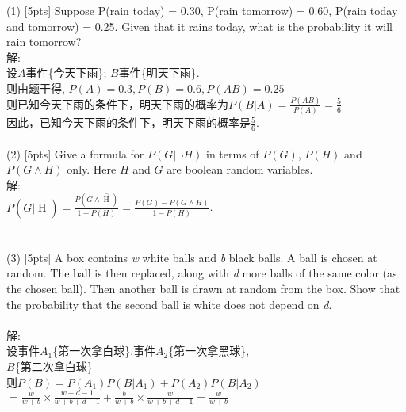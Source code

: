 \documentclass{article}
\begin{document}
	\noindent(1) [5pts] Suppose P(rain today) = 0.30, P(rain tomorrow) = 0.60,
	P(rain today and tomorrow) = 0.25. Given that it rains today, what
	is the probability it will rain tomorrow?\\
解:\\
\indent 设$A$事件\{今天下雨\}; $B$事件\{明天下雨\}.\\
\indent 则由题干得, $P(A)=0.3,P(B)=0.6,P(AB)=0.25$\\
\indent 则已知今天下雨的条件下，明天下雨的概率为$P(B|A)=\frac{P(AB)}{P(A)}=\frac{5}{6}$\\
\indent 因此，已知今天下雨的条件下，明天下雨的概率是$\frac{5}{6}$.\\
\\
	(2) [5pts] Give a formula for $P(G | \neg H)$ in terms of $P(G)$,
	$P(H)$ and $P(G \wedge H)$ only.  Here $H$ and $G$ are boolean random variables.\\
解:\\
\indent$P(G|\mathop{H}\limits^{\neg})=\frac{P(G\wedge \mathop{H}\limits^{\neg})}{1-P(H)}=\frac{P(G)-P(G\wedge H)}{1-P(H)}$.\\\\\\
	(3) [5pts] A box contains {\it w} white balls and {\it b} black
	balls. A ball is chosen at random. The ball is then replaced,
	along with {\it d} more balls of the same color (as the chosen
	ball). Then another ball is drawn at random from the box. Show
	that the probability that the second ball is white does not depend
	on {\it d}.  \\\\
解:\\
\indent 设事件$A_1$\{第一次拿白球\},事件$A_2$\{第一次拿黑球\},\\
$B$\{第二次拿白球\}\\
\indent 则$P(B)=P(A_1)P(B|A_1)+P(A_2)P(B|A_2)$\\
\indent$=\frac{w}{w+b}\times\frac{w+d-1}{w+b+d-1}+\frac{b}{w+b}\times\frac{w}{w+b+d-1}=\frac{w}{w+b}$\\
\end{document}
